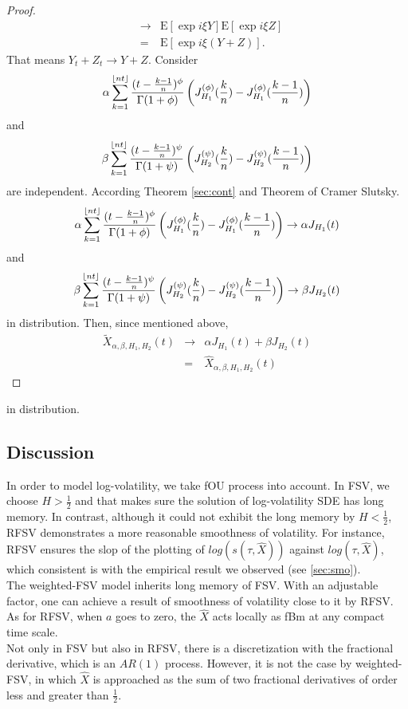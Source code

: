 \documentclass[a4paper, twoside, 11pt]{article}
\theoremstyle{definition}
\DeclarePairedDelimiter\floor{\lfloor}{\rfloor}
\newcommand{\brkt}[1]{\left({#1} \right)}
\begin{document}
\begin{proof}
\begin{eqnarray*}
  &\rightarrow& \mathrm{E}[\exp{i\xi Y}] \mathrm{E}[\exp{i\xi Z}]\\
  &=& \mathrm{E}[\exp{i\xi (Y+Z)}].
\end{eqnarray*}
That means $Y_t + Z_t \rightarrow Y+Z$. Consider 
$$
\alpha\sum_{k=1}^{\floor{nt}} \frac{(t - \frac{k-1}{n})^\phi}{\Gamma(1+\phi)} \brkt{J_{H_1}^{(\phi)}(\frac{k}{n}) - J_{H_1}^{(\phi)}(\frac{k-1}{n})}$$
and 
$$\beta\sum_{k=1}^{\floor{nt}} \frac{(t - \frac{k-1}{n})^\psi}{\Gamma(1+\psi)} \brkt{J_{H_2}^{(\psi)}(\frac{k}{n}) - J_{H_2}^{(\psi)}(\frac{k-1}{n})}
$$
are independent. According Theorem \ref{sec:cont} and Theorem of Cramer Slutsky. 
$$
\alpha\sum_{k=1}^{\floor{nt}} \frac{(t - \frac{k-1}{n})^\phi}{\Gamma(1+\phi)} \brkt{J_{H_1}^{(\phi)}(\frac{k}{n}) - J_{H_1}^{(\phi)}(\frac{k-1}{n})} \rightarrow \alpha J_{H_1}(t)
$$ and
$$
\beta\sum_{k=1}^{\floor{nt}} \frac{(t - \frac{k-1}{n})^\psi}{\Gamma(1+\psi)} \brkt{J_{H_2}^{(\psi)}(\frac{k}{n}) - J_{H_2}^{(\psi)}(\frac{k-1}{n})} \rightarrow \beta J_{H_2}(t)
$$ in distribution.
Then, since mentioned above,
\begin{eqnarray*}
  \tilde{X}_{\alpha,\beta,H_1,H_2}(t) &\rightarrow& \alpha J_{H_1}(t) + \beta J_{H_2}(t)\\
  &=& \hat{X}_{\alpha,\beta,H_1,H_2}(t)
\end{eqnarray*}
	\end{proof}
	in distribution.
	\subsection{Discussion}
   In order to model log-volatility, we take fOU process into account. In FSV, we choose $H > \frac{1}{2}$ and that makes sure the solution of log-volatility SDE has long memory. In contrast, although it could not exhibit the long memory by $H < \frac{1}{2}$, RFSV demonstrates a more reasonable smoothness of volatility. For instance, RFSV ensures  the slop of the plotting of $log(s(\tau, \hat{X}))$ against $log(\tau, \hat{X})$, which consistent is with the empirical result we observed (see \ref{sec:smo}).\\
	The weighted-FSV model inherits long memory of FSV. With an adjustable factor, one can achieve a result of smoothness of volatility close to it by RFSV. As for RFSV, when $a$ goes to zero, the $\hat{X}$ acts locally as fBm at any compact time scale.\\
	Not only in FSV but also in RFSV, there is a discretization with the fractional derivative, which is an $AR(1)$ process. However, it is not the case by weighted-FSV, in which $\hat{X}$ is approached as the sum of two fractional derivatives of order less and greater than $\frac{1}{2}$.
\end{document}
